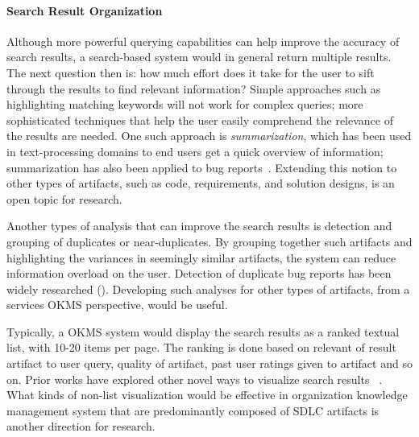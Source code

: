 \paragraph*{Search Result Organization}
Although more powerful querying capabilities can help improve the accuracy of
search results, a search-based system would in general return multiple
results. The next question then is: how much effort does it take for the user to
sift through the results to find relevant information? Simple approaches such as
highlighting matching keywords will not work for complex queries; more
sophisticated techniques that help the user easily comprehend the relevance of
the results are needed. One such approach is \textit{summarization}, which has
been used in text-processing domains to end users get a quick overview of
information; summarization has also been applied to bug
reports~\cite{Mani:2012,Rastkar:2010}. Extending this notion to other types of
artifacts, such as code, requirements, and solution designs, is an open topic
for research.

Another types of analysis that can improve the search results is detection and
grouping of duplicates or near-duplicates. By grouping together such artifacts
and highlighting the variances in seemingly similar artifacts, the system can
reduce information overload on the user.  Detection of duplicate bug reports has
been widely researched
(\eg \cite{wang2008approach,sun2010discriminative}). Developing such analyses
for other types of artifacts, from a services OKMS perspective, would be useful.

Typically, a OKMS system would display the search results as a ranked textual list, with 10-20 items per page. The ranking is done based on relevant of result artifact to user query, quality of artifact, past user ratings given to artifact and so on. Prior works have explored other novel ways to visualize search results ~\cite{Nowell:1996,Shneiderman:2000}. What kinds of non-list visualization would be effective in organization knowledge management system that are predominantly composed of SDLC artifacts is another direction for research. 

